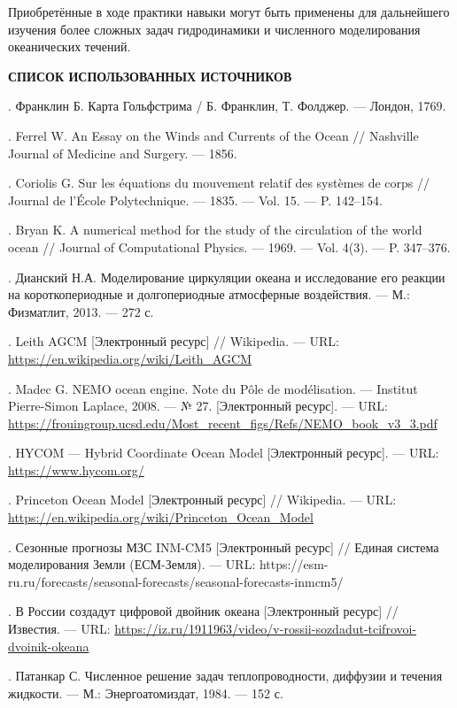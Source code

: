 \documentclass[a4paper,14pt]{extarticle}
\begin{document}
\noindent Приобретённые в ходе практики навыки могут быть применены для дальнейшего изучения более сложных задач гидродинамики и численного моделирования океанических течений.

\newpage


\begin{center}
    \textbf{\Large СПИСОК ИСПОЛЬЗОВАННЫХ ИСТОЧНИКОВ}
\end{center}

\vspace{0.5cm}

. Франклин Б. Карта Гольфстрима / Б. Франклин, Т. Фолджер. — Лондон, 1769.

. Ferrel W. An Essay on the Winds and Currents of the Ocean // Nashville Journal of Medicine and Surgery. — 1856.

. Coriolis G. Sur les équations du mouvement relatif des systèmes de corps // Journal de l'École Polytechnique. — 1835. — Vol. 15. — P. 142–154.

. Bryan K. A numerical method for the study of the circulation of the world ocean // Journal of Computational Physics. — 1969. — Vol. 4(3). — P. 347–376.

. Дианский Н.А. Моделирование циркуляции океана и исследование его реакции на короткопериодные и долгопериодные атмосферные воздействия. — М.: Физматлит, 2013. — 272 с.

. Leith AGCM [Электронный ресурс] // Wikipedia. — URL: \url{https://en.wikipedia.org/wiki/Leith_AGCM}

. Madec G. NEMO ocean engine. Note du Pôle de modélisation. — Institut Pierre-Simon Laplace, 2008. — № 27. [Электронный ресурс]. — URL: \url{https://frouingroup.ucsd.edu/Most_recent_figs/Refs/NEMO_book_v3_3.pdf}

. HYCOM — Hybrid Coordinate Ocean Model [Электронный ресурс]. — URL: \url{https://www.hycom.org/} 

. Princeton Ocean Model [Электронный ресурс] // Wikipedia. — URL: \url{https://en.wikipedia.org/wiki/Princeton_Ocean_Model} 

. Сезонные прогнозы МЗС INM-CM5 [Электронный ресурс] // Единая система моделирования Земли (ЕСМ-Земля). — URL: https://esm-ru.ru/forecasts/seasonal-forecasts/seasonal-forecasts-inmcm5/ 

. В России создадут цифровой двойник океана [Электронный ресурс] // Известия. — URL: \url{https://iz.ru/1911963/video/v-rossii-sozdadut-tcifrovoi-dvoinik-okeana} 

. Патанкар С. Численное решение задач теплопроводности, диффузии и течения жидкости. — М.: Энергоатомиздат, 1984. — 152 с.
\end{document}
